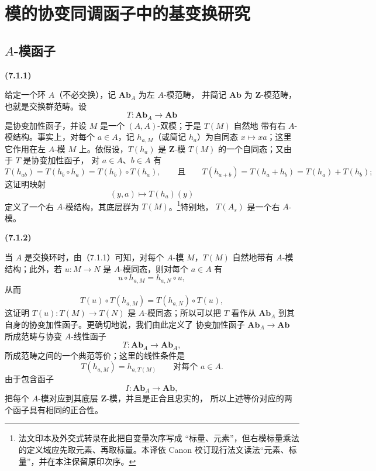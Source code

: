 \documentclass[UTF8,fontset=none,11pt,oneside,openany]{ctexbook}
\newcommand{\SourceCorrectionNote}[1]{\footnote{#1}}
\newenvironment{env}[1][]{%
  \par\medskip\noindent\textbf{(#1)}\ %
}{\par}
\let\EGAOriginalLabel\label
\renewcommand{\label}[1]{\phantomsection\EGAOriginalLabel{#1}}
\begin{document}

\section{模的协变同调函子中的基变换研究}
\label{section:III.7.fr}

\subsection[A-模函子]{$A$-模函子}
\label{subsection:III.7.1.fr}

\begin{env}[7.1.1]
给定一个环 $A$（不必交换），记 $\mathbf{Ab}_A$ 为左 $A$-模范畴，
并简记 $\mathbf{Ab}$ 为 $\mathbf Z$-模范畴，也就是交换群范畴。设
\[
  T:\mathbf{Ab}_A\longrightarrow\mathbf{Ab}
\]
是协变加性函子，并设 $M$ 是一个 $(A,A)$-双模；于是 $T(M)$ 自然地
带有右 $A$-模结构。事实上，对每个 $a\in A$，记 $h_{a,M}$（或简记
$h_a$）为自同态 $x\mapsto xa$；这里它作用在左 $A$-模 $M$ 上。依假设，$T(h_a)$
是 $\mathbf Z$-模 $T(M)$ 的一个自同态；又由于 $T$ 是协变加性函子，
对 $a\in A$、$b\in A$ 有
\[
  T(h_{ab})
  =
  T(h_b\circ h_a)
  =
  T(h_b)\circ T(h_a),
  \qquad\text{且}\qquad
  T(h_{a+b})
  =
  T(h_a+h_b)
  =
  T(h_a)+T(h_b);
\]
这证明映射
\[
  (y,a)\longmapsto T(h_a)(y)
\]
定义了一个右 $A$-模结构，其底层群为 $T(M)$。\SourceCorrectionNote{法文印本及外交式转录在此把自变量次序写成
“标量、元素”，但右模标量乘法的定义域应先取元素、再取标量。本译依 Canon
校订现行法文读法“元素、标量”，并在本注保留原印次序。}特别地，
$T(A_s)$ 是一个右 $A$-模。
\end{env}

\begin{env}[7.1.2]
当 $A$ 是交换环时，由（7.1.1）可知，对每个 $A$-模 $M$，$T(M)$
自然地带有 $A$-模结构；此外，若 $u:M\to N$ 是 $A$-模同态，则对每个
$a\in A$ 有
\[
  u\circ h_{a,M}=h_{a,N}\circ u,
\]
从而
\[
  T(u)\circ T(h_{a,M})
  =
  T(h_{a,N})\circ T(u),
\]
这证明 $T(u):T(M)\to T(N)$ 是 $A$-模同态；所以可以把 $T$ 看作从
$\mathbf{Ab}_A$ 到其自身的协变加性函子。更确切地说，我们由此定义了
协变加性函子 $\mathbf{Ab}_A\to\mathbf{Ab}$ 所成范畴与协变 $A$-线性函子
\[
  T:\mathbf{Ab}_A\longrightarrow\mathbf{Ab}_A,
\]
所成范畴之间的一个典范等价；这里的线性条件是
\[
  T(h_{a,M})=h_{a,T(M)}
  \qquad\text{对每个 }a\in A.
\]
由于包含函子
\[
  I:\mathbf{Ab}_A\longrightarrow\mathbf{Ab},
\]
把每个 $A$-模对应到其底层 $\mathbf Z$-模，并且是正合且忠实的，
所以上述等价对应的两个函子具有相同的正合性。
\end{env}
\end{document}
